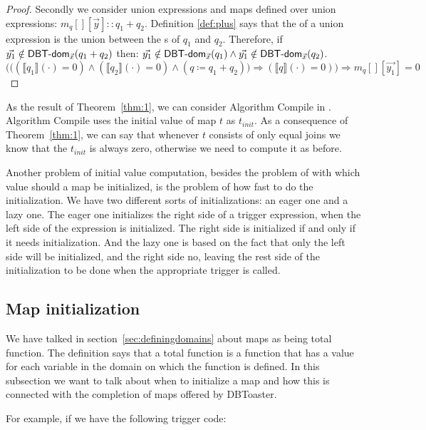 \documentclass[12pt]{article}
\begin{document}
\begin{proof}
Secondly we consider union expressions and maps defined over union expressions: $m_q[][\vec{y}]::q_1+q_2$. Definition \ref{def:plus} says that the \dom{} of a union expression is the union between the \dom{}s of $q_1$ and $q_2$. Therefore, if $\vec{y_{1}}\notin\textsf{DBT-dom}{}_{\vec{x}}(q_1+q_2)$ then: $\vec{y_{1}}\notin\textsf{DBT-dom}{}_{\vec{x}}(q_1)\land \vec{y_{1}}\notin\textsf{DBT-dom}{}_{\vec{x}}(q_2)$.
\begin{equation}
\Big(\big((\llbracket q_{1}\rrbracket(\cdot)=0)\land (\llbracket q_{2}\rrbracket(\cdot)=0)\land(q\coloneqq q_{1}+q_{2})\big)\Rightarrow (\llbracket q\rrbracket(\cdot)=0)\Big)\Rightarrow m_{q}[][\vec{y_{1}}]=0
\end{equation}
\end{proof}
As the result of Theorem~\ref{thm:1}, we can consider Algorithm Compile in \cite{1}. Algorithm Compile uses the initial value of map $t$ as $t_{init}$. As a consequence of Theorem~\ref{thm:1}, we can say that whenever $t$ consists of only equal joins we know that the $t_{init}$ is always zero, otherwise we need to compute it as before.\\ \par
Another problem of initial value computation, besides the problem of with which value should a map be initialized, is the problem of how fast to do the initialization. We have two different sorts of initializations: an eager one and a lazy one. The eager one initializes the right side of a trigger expression, when the left side of the expression is initialized. The right side is initialized if and only if it needs initialization. And the lazy one is based on the fact that only the left side will be initialized, and the right side no, leaving the rest side of the initialization to be done when the appropriate trigger is called.

\subsection{Map initialization}

We have talked in section~\ref{sec:definingdomains} about maps as being total function. The definition says that a total function is a function that has a value for each variable in the domain on which the function is defined. In this subsection we want to talk about when to initialize a map and how this is connected with the completion of maps offered by DBToaster.

For example, if we have the following trigger code:
\end{document}
